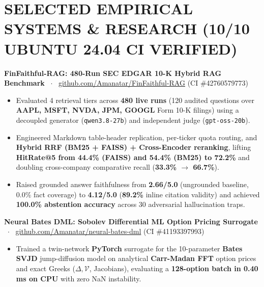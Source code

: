\documentclass[10pt,a4paper]{article}
\begin{document}
\section*{SELECTED EMPIRICAL SYSTEMS \& RESEARCH (10/10 UBUNTU 24.04 CI VERIFIED)}
\noindent\textbf{FinFaithful-RAG: 480-Run SEC EDGAR 10-K Hybrid RAG Benchmark} \ $\cdot$ \ \href{https://github.com/Amanatar/FinFaithful-RAG}{github.com/Amanatar/FinFaithful-RAG} (CI \#42760579773)
\begin{itemize}
    \item Evaluated 4 retrieval tiers across \textbf{480 live runs} (120 audited questions over \textbf{AAPL, MSFT, NVDA, JPM, GOOGL} Form 10-K filings) using a decoupled generator (\texttt{qwen3.8-27b}) and independent judge (\texttt{gpt-oss-20b}).
    \item Engineered Markdown table-header replication, per-ticker quota routing, and \textbf{Hybrid RRF (BM25 + FAISS) + Cross-Encoder reranking}, lifting \textbf{HitRate@5 from 44.4\% (FAISS) and 54.4\% (BM25) to 72.2\%} and doubling cross-company comparative recall (\textbf{33.3\% $\rightarrow$ 66.7\%}).
    \item Raised grounded answer faithfulness from \textbf{2.66/5.0} (ungrounded baseline, 0.0\% fact coverage) to \textbf{4.12/5.0} (\textbf{89.2\%} inline citation validity) and achieved \textbf{100.0\% abstention accuracy} across 30 adversarial hallucination traps.
\end{itemize}
\vspace{1pt}

\noindent\textbf{Neural Bates DML: Sobolev Differential ML Option Pricing Surrogate} \ $\cdot$ \ \href{https://github.com/Amanatar/neural-bates-dml}{github.com/Amanatar/neural-bates-dml} (CI \#41193397993)
\begin{itemize}
    \item Trained a twin-network \textbf{PyTorch} surrogate for the 10-parameter \textbf{Bates SVJD} jump-diffusion model on analytical \textbf{Carr-Madan FFT} option prices and exact Greeks ($\Delta, \mathcal{V}$, Jacobians), evaluating a \textbf{128-option batch in 0.40 ms on CPU} with zero NaN instability.
\end{itemize}
\vspace{1pt}
\end{document}
